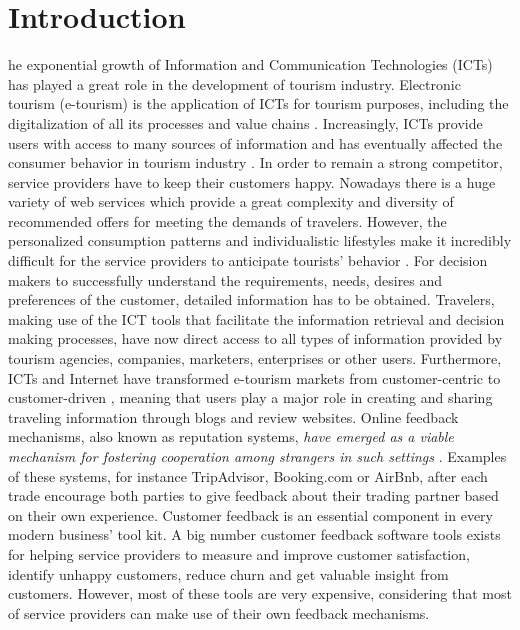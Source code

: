 %
%
\let\textcircled=\pgftextcircled
\chapter{Introduction}
\label{chap:intro}
%
%
he exponential growth of Information and Communication Technologies (ICTs) has played a great role in the development of tourism industry. Electronic tourism (e-tourism) is the application of ICTs for tourism purposes, including the digitalization of all its processes and value chains \cite{buhalis2003etourism}. Increasingly, ICTs provide users with access to many sources of information and has eventually affected the consumer behavior in tourism industry \cite{mills2004handbook}. In order to remain a strong competitor, service providers have to keep their customers happy. Nowadays there is a huge variety of web services which provide a great complexity and diversity of recommended offers for meeting the demands of travelers. However, the personalized consumption patterns and individualistic lifestyles make it incredibly difficult for the service providers to anticipate tourists' behavior \cite{niemann2008enhancing}. For decision makers to successfully understand the requirements, needs, desires and preferences of the customer, detailed information has to be obtained. Travelers, making use of the ICT tools that facilitate the information retrieval and decision making processes, have now direct access to all types of information provided by tourism agencies, companies, marketers, enterprises or other users. Furthermore, ICTs and Internet have transformed e-tourism markets from customer-centric to customer-driven \cite{buhalis2011tourism}, meaning that users play a major role in creating and sharing traveling information through blogs and review websites. Online feedback mechanisms, also known as reputation systems, \textit{have emerged as a viable mechanism for fostering cooperation among strangers in such settings} \cite{dellarocas2003digitization}. Examples of these systems, for instance TripAdvisor, Booking.com or AirBnb, after each trade encourage both parties to give feedback about their trading partner based on their own experience. 
Customer feedback is an essential component in every modern business' tool kit. A big number customer feedback software tools exists for helping service providers to measure and improve customer satisfaction, identify unhappy customers, reduce churn and get valuable insight from customers. However, most of these tools are very expensive, considering that most of service providers can make use of their own feedback mechanisms.
%
